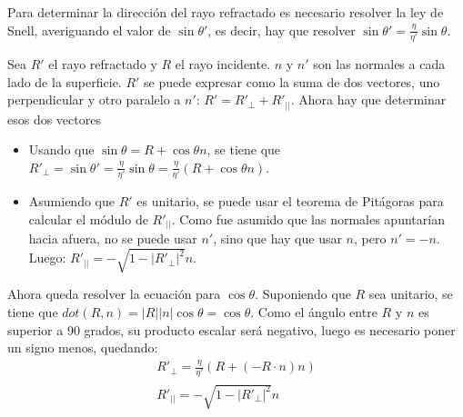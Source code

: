 \documentclass[12pt]{article}
\theoremstyle{definition}
\theoremstyle{remark}
\begin{document}
Para determinar la dirección del rayo refractado es necesario resolver la ley de Snell, averiguando el valor de $\sin\theta'$, es decir, hay que resolver $\sin\theta'=\frac{\eta}{\eta'}\sin\theta$.

\begin{figure}[H]
\centering
{}
\end{figure}

Sea $R'$ el rayo refractado y $R$ el rayo incidente. $n$ y $n'$ son las normales a cada lado de la superficie. $R'$ se puede expresar como la suma de dos vectores, uno perpendicular y otro paralelo a $n'$: $R'=R'_{\perp}+R'_{||}$. Ahora hay que determinar esos dos vectores
\begin{itemize}
\item Usando que $\sin\theta=R+\cos\theta n$, se tiene que $R'_{\perp}=\sin\theta'=\frac{\eta}{\eta'}\sin\theta=\frac{\eta}{\eta'}(R+\cos\theta n)$.
\item Asumiendo que $R'$ es unitario, se puede usar el teorema de Pitágoras para calcular el módulo de $R'_{||}$. Como fue asumido que las normales apuntarían hacia afuera, no se puede usar $n'$, sino que hay que usar $n$, pero $n'=-n$. Luego: $R'_{||}=-\sqrt{1-|R'_{\perp}|^2}n$.
\end{itemize}
Ahora queda resolver la ecuación para $\cos\theta$. Suponiendo que $R$ sea unitario, se tiene que $dot(R,n)=|R||n|\cos\theta=\cos\theta$. Como el ángulo entre $R$ y $n$ es superior a 90 grados, su producto escalar será negativo, luego es necesario poner un signo menos, quedando:
\[
\begin{array}{ll}
R'_{\perp}=\frac{\eta}{\eta'}(R+(-R\cdot n)n)\\
R'_{||}=-\sqrt{1-|R'_{\perp}|^2}n
\end{array}
\]
\end{document}
